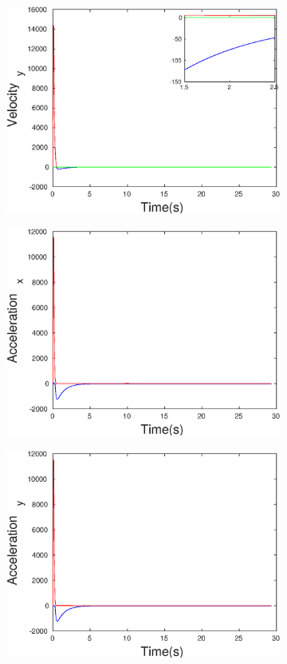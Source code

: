 \begin{figure}[h]
\begin{subfigure}{.5\linewidth}
\end{subfigure}
\begin{subfigure}{.5\linewidth}
\centering
\includegraphics[width=.9\linewidth]{figures/HInf/s3caHInfVelocity_y}
\end{subfigure}
\begin{subfigure}{.5\linewidth}
\centering
\includegraphics[width=.9\linewidth]{figures/HInf/s3caHInfAcceleration_x}
\end{subfigure}
\begin{subfigure}{.5\linewidth}
\centering
\includegraphics[width=.9\linewidth]{figures/HInf/s3caHInfAcceleration_y}

\end{subfigure}
\end{figure}
